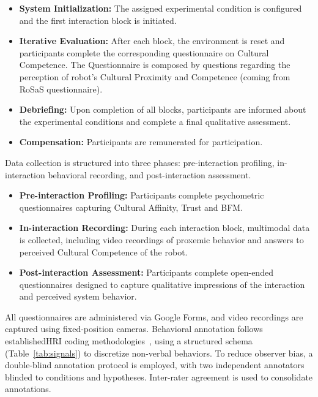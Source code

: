 \begin{itemize}
\item \textbf{System Initialization:} The assigned experimental condition is configured and the first interaction block is initiated.

\item \textbf{Iterative Evaluation:} After each block, the environment is reset and participants complete the corresponding questionnaire on Cultural Competence. The Questionnaire is composed by questions regarding the perception of robot's Cultural Proximity and Competence (coming from RoSaS questionnaire).

\item \textbf{Debriefing:} Upon completion of all blocks, participants are informed about the experimental conditions and complete a final qualitative assessment.

\item \textbf{Compensation:} Participants are remunerated for participation.
\end{itemize}

Data collection is structured into three phases: pre-interaction profiling, in-interaction behavioral recording, and post-interaction assessment.

\begin{itemize}
    \item \textbf{Pre-interaction Profiling:} Participants complete psychometric questionnaires capturing Cultural Affinity, Trust and BFM.

    \item \textbf{In-interaction Recording:} During each interaction block, multimodal data is collected, including video recordings of proxemic behavior and answers to perceived Cultural Competence of the robot. 

    \item \textbf{Post-interaction Assessment:} Participants complete open-ended questionnaires designed to capture qualitative impressions of the interaction and perceived system behavior.
\end{itemize}

All questionnaires are administered via Google Forms, and video recordings are captured using fixed-position cameras.
Behavioral annotation follows establishedHRI coding methodologies~\citep{9515502}, using a structured schema (Table~\ref{tab:signals}) to discretize non-verbal behaviors. To reduce observer bias, a double-blind annotation protocol is employed, with two independent annotators blinded to conditions and hypotheses. Inter-rater agreement is used to consolidate annotations.



